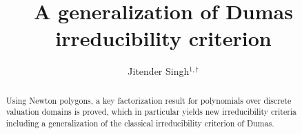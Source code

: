 \documentclass[12pt]{amsart}%
\begin{document}
\newtheorem{theorem}{Theorem}
\newtheorem{corollary}[theorem]{Corollary}
\newtheorem{lemma}[theorem]{Lemma}
\theoremstyle{definition}
\newtheorem*{example}{\bf Example}
\theoremstyle{theorem}
\newtheorem{conjecture}[theorem]{Conjecture}
\newtheorem{thmx}{\bf Theorem}
\renewcommand{\thethmx}{\text{\Alph{thmx}}}%
\newtheorem{lemmax}{\bf Lemma}
\renewcommand{\thelemmax}{\text{\Alph{lemmax}}}%
\hoffset=-0cm
\theoremstyle{definition}
\newtheorem*{definition}{Definition}
\theoremstyle{remark}
\newtheorem*{remark}{\bf Remark}
\theoremstyle{remark}
\newtheorem*{remarks}{\bf Remarks}
\parindent=0cm
\title{\bf A generalization of Dumas irreducibility criterion}
\author{Jitender Singh$^{1,\dagger}$ {\large {}}}
\address[1]{Department of Mathematics,
Guru Nanak Dev University, Amritsar-143005, India\newline %
{\tt jitender.math@gndu.ac.in}}
\markright{}
\date{}
\maketitle
\newcommand{\K}{\mathbb{K}}
\begin{abstract}
Using Newton polygons, a key factorization result for polynomials over discrete valuation domains is proved, which in particular yields new irreducibility criteria including a generalization of the classical irreducibility criterion of Dumas.
\end{abstract}
\end{document}
